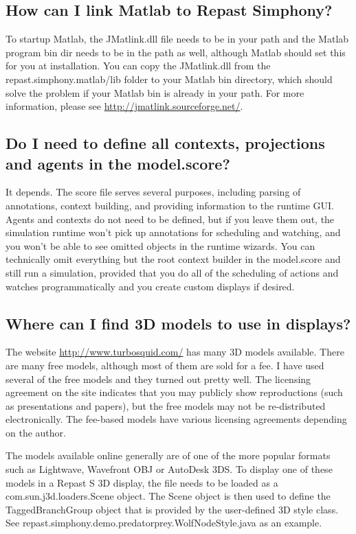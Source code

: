 \documentclass[11pt]{article}
\begin{document}
\subsection{How can I link Matlab to Repast Simphony?}
\label{prs:mat_lab}

To startup Matlab, the JMatlink.dll file needs to be in your path and the Matlab program bin dir needs to be in the path as well, although Matlab should set this for you at installation. You can copy the JMatlink.dll from the repast.simphony.matlab/lib folder to your Matlab bin directory, which should solve the problem if your Matlab bin is already in your path. For more information, please see \url{http://jmatlink.sourceforge.net/}.

\subsection{Do I need to define all contexts, projections and agents in the model.score?}
\label{prs:model_score}

It depends. The score file serves several purposes, including parsing of annotations, context building, and providing information to the runtime GUI. Agents and contexts do not need to be defined, but if you leave them out, the simulation runtime won't pick up annotations for scheduling and watching, and you won't be able to see omitted objects in the runtime wizards. You can technically omit everything but the root context builder in the model.score and still run a simulation, provided that you do all of the scheduling of actions and watches programmatically and you create custom displays if desired.

\subsection{Where can I find 3D models to use in displays?}
\label{prs:3d_models}

The website \url{http://www.turbosquid.com/} has many 3D models available. There are many free models, although most of them are sold for a fee. I have used several of the free models and they turned out pretty well. The licensing agreement on the site indicates that you may publicly show reproductions (such as presentations and papers), but the free models may not be re-distributed electronically. The fee-based models have various licensing agreements depending on the author.

The models available online generally are of one of the more popular formats such as Lightwave, Wavefront OBJ or AutoDesk 3DS. To display one of these models in a Repast S 3D display, the file needs to be loaded as a com.sun.j3d.loaders.Scene object. The Scene object is then used to define the TaggedBranchGroup object that is provided by the user-defined 3D style class. See repast.simphony.demo.predatorprey.WolfNodeStyle.java as an example.
\end{document}
